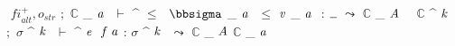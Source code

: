 {{\ensuremath{}  \ensuremath{\textit{fi}_{alt}^{+},o_{str}}  \ensuremath{;}  \ensuremath{\mathbb{C}} _{ \ensuremath{\Varid{a}} } \ensuremath{}  \ensuremath{\vdash } ^{ \ensuremath{\leq } } \ensuremath{}  \ensuremath{\mathbb{\bbsigma}} _{ \ensuremath{\Varid{a}} } \ensuremath{}  \ensuremath{\leq }  \ensuremath{\Varid{v}} _{ \ensuremath{\Varid{a}} } \ensuremath{}  \ensuremath{\mathbin{:}}  \ensuremath{\anonymous }  \ensuremath{\leadsto }  \ensuremath{\mathbb{C}} _{ \ensuremath{\Conid{A}} } \ensuremath{}  \ensuremath{} 
}
{%
\ensuremath{}  \ensuremath{\mathbb{C}} ^{ \ensuremath{\Varid{k}} } \ensuremath{}  \ensuremath{;}  \ensuremath{\sigma } ^{ \ensuremath{\Varid{k}} } \ensuremath{}  \ensuremath{\vdash } ^{ \ensuremath{\Varid{e}} } \ensuremath{}  \ensuremath{\Varid{f}\;\Varid{a}}  \ensuremath{\mathbin{:}}  \ensuremath{\sigma } ^{ \ensuremath{\Varid{k}} } \ensuremath{}  \ensuremath{\leadsto }  \ensuremath{\mathbb{C}} _{ \ensuremath{\Conid{A}} } \ensuremath{\mathbb{C}} _{ \ensuremath{\Varid{a}} } \ensuremath{}  \ensuremath{} 
}
}


